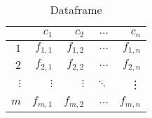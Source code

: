 \begin{table}[ht]
    \centering
    \begin{tabular}{ r | r r r r }
        \hline
                    & $c_1$     & $c_2$     & $\dots$   & $c_n$     \\
        \hline
        $1$         & $f_{1,1}$ & $f_{1,2}$ & $\dots$   & $f_{1,n}$ \\
        $2$         & $f_{2,1}$ & $f_{2,2}$ & $\dots$   & $f_{2,n}$ \\
        $\vdots$    & $\vdots$  & $\vdots$  & $\ddots$  & \vdots    \\
        $m$         & $f_{m,1}$ & $f_{m,2}$ & $\dots$   & $f_{m,n}$ \\
        \hline
    \end{tabular}
    \caption{Dataframe}
    \label{tab:dataframe}
\end{table}